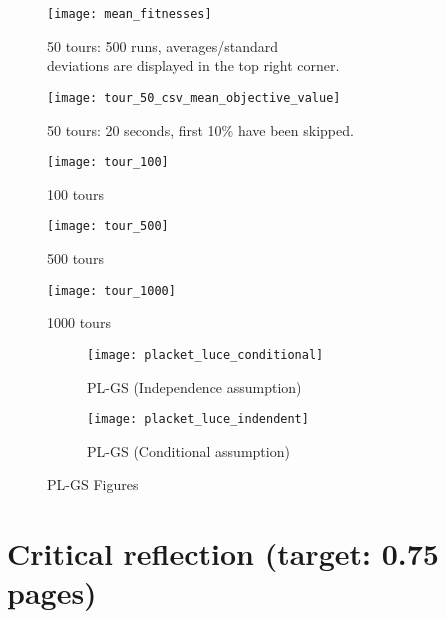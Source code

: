 \documentclass[a4paper,10pt]{article}
\begin{document}
\begin{figure}[htbp]
	\centering
	\begin{minipage}{0.5\linewidth}
		\centering
		\texttt{[image: mean\_fitnesses]}
		\caption{50 tours: 500 runs, averages/standard \\ deviations are displayed in the top right corner.}
		\label{fig:meanfitnesses}
	\end{minipage}%
	\begin{minipage}{0.5\linewidth}
		\centering
		\texttt{[image: tour\_50\_csv\_mean\_objective\_value]}
		\caption{50 tours: 20 seconds, first 10\% have been skipped.}
		\label{fig:tour50csvmeanobjectivevalue}
	\end{minipage}%
	
	\begin{minipage}{0.5\linewidth}
		\centering
		\texttt{[image: tour\_100]}
		\caption{100 tours}
		\label{fig:tour100}
	\end{minipage}%
	\begin{minipage}{0.5\linewidth}
		\centering
		\texttt{[image: tour\_500]}
		\caption{500 tours}
		\label{fig:tour500}
	\end{minipage}
	
	\begin{minipage}{0.5\linewidth}
		\centering
		\texttt{[image: tour\_1000]}
		\caption{1000 tours}
		\label{fig:tour1000}
	\end{minipage}%
\end{figure}
	
\begin{figure}[htbp]
		\centering
		\begin{subfigure}{0.48\linewidth}
			\texttt{[image: placket\_luce\_conditional]}
			\caption{PL-GS (Independence assumption)}
			\label{fig:placketluceconditional}
		\end{subfigure}
		\hfill
		\begin{subfigure}{0.48\linewidth}
			\texttt{[image: placket\_luce\_indendent]}
			\caption{PL-GS (Conditional assumption)}
			\label{fig:placketluceindendent}
		\end{subfigure}
		\caption{PL-GS Figures}
\end{figure}
	



\section{Critical reflection (target: 0.75 pages)}
\end{document}
